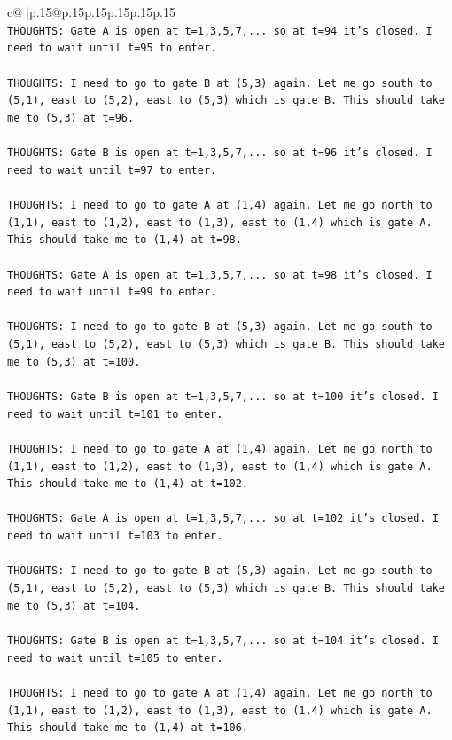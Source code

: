 \documentclass{article}
\begin{document}
{\begin{supertabular}{c@{$\;$}|p{.15\linewidth}@{}p{.15\linewidth}p{.15\linewidth}p{.15\linewidth}p{.15\linewidth}p{.15\linewidth}}
{{{\\ 
\texttt{THOUGHTS: Gate A is open at t=1,3,5,7,... so at t=94 it's closed. I need to wait until t=95 to enter.} \\
\\ 
\texttt{THOUGHTS: I need to go to gate B at (5,3) again. Let me go south to (5,1), east to (5,2), east to (5,3) which is gate B. This should take me to (5,3) at t=96.} \\
\\ 
\texttt{THOUGHTS: Gate B is open at t=1,3,5,7,... so at t=96 it's closed. I need to wait until t=97 to enter.} \\
\\ 
\texttt{THOUGHTS: I need to go to gate A at (1,4) again. Let me go north to (1,1), east to (1,2), east to (1,3), east to (1,4) which is gate A. This should take me to (1,4) at t=98.} \\
\\ 
\texttt{THOUGHTS: Gate A is open at t=1,3,5,7,... so at t=98 it's closed. I need to wait until t=99 to enter.} \\
\\ 
\texttt{THOUGHTS: I need to go to gate B at (5,3) again. Let me go south to (5,1), east to (5,2), east to (5,3) which is gate B. This should take me to (5,3) at t=100.} \\
\\ 
\texttt{THOUGHTS: Gate B is open at t=1,3,5,7,... so at t=100 it's closed. I need to wait until t=101 to enter.} \\
\\ 
\texttt{THOUGHTS: I need to go to gate A at (1,4) again. Let me go north to (1,1), east to (1,2), east to (1,3), east to (1,4) which is gate A. This should take me to (1,4) at t=102.} \\
\\ 
\texttt{THOUGHTS: Gate A is open at t=1,3,5,7,... so at t=102 it's closed. I need to wait until t=103 to enter.} \\
\\ 
\texttt{THOUGHTS: I need to go to gate B at (5,3) again. Let me go south to (5,1), east to (5,2), east to (5,3) which is gate B. This should take me to (5,3) at t=104.} \\
\\ 
\texttt{THOUGHTS: Gate B is open at t=1,3,5,7,... so at t=104 it's closed. I need to wait until t=105 to enter.} \\
\\ 
\texttt{THOUGHTS: I need to go to gate A at (1,4) again. Let me go north to (1,1), east to (1,2), east to (1,3), east to (1,4) which is gate A. This should take me to (1,4) at t=106.} \\
}}}
\end{supertabular}}
\end{document}
